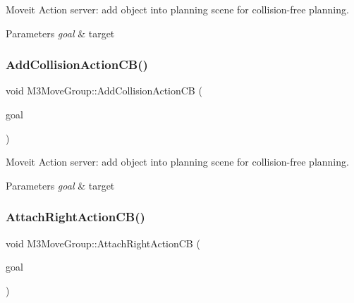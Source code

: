 Moveit Action server\+: add object into planning scene for collision-\/free planning. 


\begin{DoxyParams}{Parameters}
{\em goal} & target \\
\hline
\end{DoxyParams}
\mbox{\label{classM3MoveGroup_aa1aa80c1a53d3829ed0e535f728cbe63}} 
\subsubsection{\texorpdfstring{Add\+Collision\+Action\+C\+B()}{AddCollisionActionCB()}\hspace{0.1cm}{\footnotesize\ttfamily [2/2]}}
{\footnotesize\ttfamily void M3\+Move\+Group\+::\+Add\+Collision\+Action\+CB (\begin{DoxyParamCaption}\item[{const m3\+\_\+moveit\+::\+Moveit\+Collide\+Goal\+Const\+Ptr \&}]{goal }\end{DoxyParamCaption})\hspace{0.3cm}{\ttfamily [inline]}}



Moveit Action server\+: add object into planning scene for collision-\/free planning. 


\begin{DoxyParams}{Parameters}
{\em goal} & target \\
\hline
\end{DoxyParams}
\mbox{\label{classM3MoveGroup_abbc7367f21a594bd3ae7a91fe6441480}} 
\subsubsection{\texorpdfstring{Attach\+Right\+Action\+C\+B()}{AttachRightActionCB()}\hspace{0.1cm}{\footnotesize\ttfamily [1/2]}}
{\footnotesize\ttfamily void M3\+Move\+Group\+::\+Attach\+Right\+Action\+CB (\begin{DoxyParamCaption}\item[{const m3\+\_\+moveit\+::\+Moveit\+Pick\+Place\+Goal\+Const\+Ptr \&}]{goal }\end{DoxyParamCaption})\hspace{0.3cm}{\ttfamily [inline]}}



